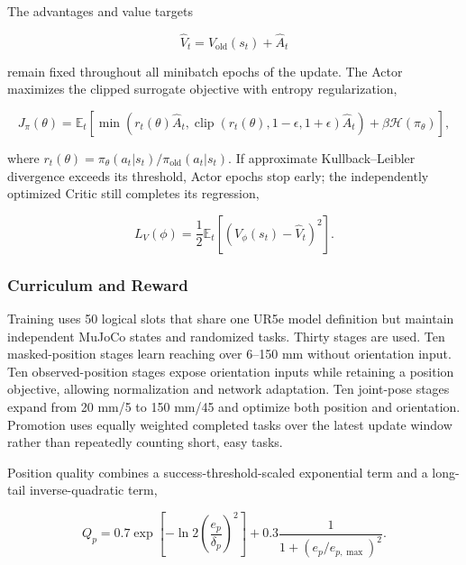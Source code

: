\documentclass[conference]{IEEEtran}
\begin{document}
The advantages and value targets

\begin{equation}
\hat{V}_t=V_{\mathrm{old}}(s_t)+\hat{A}_t

\end{equation}

remain fixed throughout all minibatch epochs of the update. The Actor maximizes the clipped surrogate objective with entropy regularization,

\begin{equation}
J_{\pi}(\theta)=\mathbb{E}_t\!\left[
\min\!\left(r_t(\theta)\hat{A}_t,
\operatorname{clip}(r_t(\theta),1-\epsilon,1+\epsilon)\hat{A}_t\right)
+\beta\mathcal{H}(\pi_{\theta})
\right],

\end{equation}

where \(r_t(\theta)=\pi_{\theta}(a_t|s_t)/\pi_{\mathrm{old}}(a_t|s_t)\). If approximate Kullback--Leibler divergence exceeds its threshold, Actor epochs stop early; the independently optimized Critic still completes its regression,

\begin{equation}
L_V(\phi)=\frac{1}{2}\mathbb{E}_t[(V_{\phi}(s_t)-\hat{V}_t)^2].

\end{equation}

\subsubsection{Curriculum and Reward}

Training uses 50 logical slots that share one UR5e model definition but maintain independent MuJoCo states and randomized tasks. Thirty stages are used. Ten masked-position stages learn reaching over 6--150 mm without orientation input. Ten observed-position stages expose orientation inputs while retaining a position objective, allowing normalization and network adaptation. Ten joint-pose stages expand from 20 mm/5\textdegree{} to 150 mm/45\textdegree{} and optimize both position and orientation. Promotion uses equally weighted completed tasks over the latest update window rather than repeatedly counting short, easy tasks.

Position quality combines a success-threshold-scaled exponential term and a long-tail inverse-quadratic term,

\begin{equation}
Q_p=0.7\exp\!\left[-\ln 2\left(\frac{e_p}{\delta_p}\right)^2\right]
+0.3\frac{1}{1+(e_p/e_{p,\max})^2}.

\end{equation}
\end{document}
